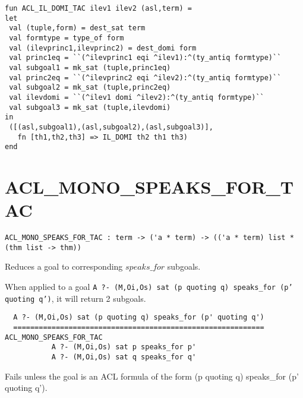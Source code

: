 \IMPLEMENTATION
\begin{holboxed}
\begin{verbatim}
fun ACL_IL_DOMI_TAC ilev1 ilev2 (asl,term) =
let
 val (tuple,form) = dest_sat term 
 val formtype = type_of form
 val (ilevprinc1,ilevprinc2) = dest_domi form
 val princ1eq = ``(^ilevprinc1 eqi ^ilev1):^(ty_antiq formtype)``
 val subgoal1 = mk_sat (tuple,princ1eq)
 val princ2eq = ``(^ilevprinc2 eqi ^ilev2):^(ty_antiq formtype)``
 val subgoal2 = mk_sat (tuple,princ2eq)
 val ilevdomi = ``(^ilev1 domi ^ilev2):^(ty_antiq formtype)``
 val subgoal3 = mk_sat (tuple,ilevdomi)
in
 ([(asl,subgoal1),(asl,subgoal2),(asl,subgoal3)], 
   fn [th1,th2,th3] => IL_DOMI th2 th1 th3)
end
\end{verbatim}
\end{holboxed}

\SEEALSO
\ENDDOC

\section{ACL\_MONO\_SPEAKS\_FOR\_TAC}



\small
\begin{lstlisting}[breaklines]
ACL_MONO_SPEAKS_FOR_TAC : term -> ('a * term) -> (('a * term) list * (thm list -> thm))
\end{lstlisting}\egroup

\SYNOPSIS
Reduces a goal to corresponding $speaks\_for$ subgoals.

\DESCRIBE When applied to a goal \texttt{A ?- (M,Oi,Os) sat (p quoting q) speaks_for (p' quoting q')}, it will return 2 subgoals.
\begin{verbatim}
  A ?- (M,Oi,Os) sat (p quoting q) speaks_for (p' quoting q')
  ===========================================================  ACL_MONO_SPEAKS_FOR_TAC
           A ?- (M,Oi,Os) sat p speaks_for p'
           A ?- (M,Oi,Os) sat q speaks_for q'
\end{verbatim}

\FAILURE 
Fails unless the goal is an ACL formula of the form (p quoting q) speaks_for (p' quoting q').

